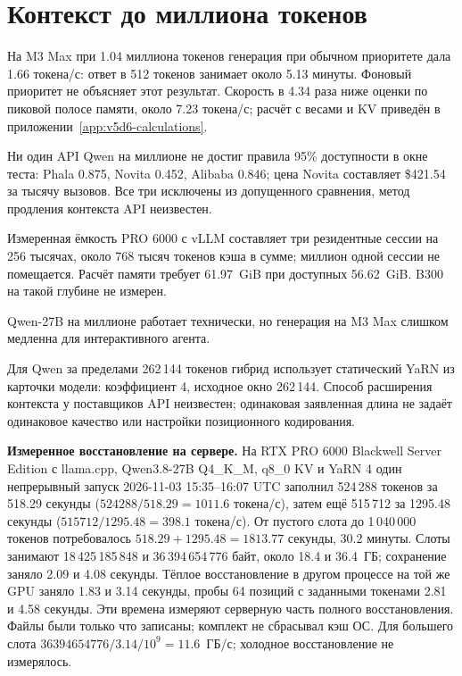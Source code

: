 \section{Контекст до миллиона токенов}
\label{sec:million}

На M3 Max при 1.04 миллиона токенов генерация при обычном приоритете дала 1.66 токена/с:
ответ в 512 токенов занимает около 5.13 минуты. Фоновый приоритет не объясняет этот результат.
Скорость в 4.34 раза ниже оценки по пиковой полосе памяти, около 7.23 токена/с;
расчёт с весами и KV приведён в приложении~\ref{app:v5d6-calculations}.

Ни один API Qwen на миллионе не достиг правила 95\% доступности в окне теста:
Phala 0.875, Novita 0.452, Alibaba 0.846; цена Novita составляет \$421.54 за тысячу вызовов.
Все три исключены из допущенного сравнения, метод продления контекста API неизвестен.

Измеренная ёмкость PRO 6000 с vLLM составляет три резидентные сессии на 256 тысячах,
около 768 тысяч токенов кэша в сумме; миллион одной сессии не помещается.
Расчёт памяти требует 61.97~GiB при доступных 56.62~GiB. B300 на такой глубине не измерен.

Qwen-27B на миллионе работает технически, но генерация на M3 Max слишком медленна для интерактивного агента.


Для Qwen за пределами 262\,144 токенов гибрид использует статический YaRN из карточки модели:
коэффициент 4, исходное окно 262\,144. Способ расширения контекста у поставщиков API неизвестен;
одинаковая заявленная длина не задаёт одинаковое качество или настройки позиционного кодирования.

\textbf{Измеренное восстановление на сервере.} На RTX PRO 6000 Blackwell Server Edition
с llama.cpp, Qwen3.8-27B Q4\_K\_M, q8\_0 KV и YaRN 4 один непрерывный запуск
2026-11-03 15:35--16:07 UTC заполнил 524\,288 токенов за 518.29 секунды
($524288/518.29=1011.6$ токена/с), затем ещё 515\,712 за 1295.48 секунды
($515712/1295.48=398.1$ токена/с). От пустого слота до 1\,040\,000 токенов
потребовалось $518.29+1295.48=1813.77$ секунды, 30.2 минуты.
Слоты занимают 18\,425\,185\,848 и 36\,394\,654\,776 байт, около 18.4 и 36.4~ГБ;
сохранение заняло 2.09 и 4.08 секунды. Тёплое восстановление в другом процессе на той же GPU заняло
1.83 и 3.14 секунды, пробы 64 позиций с заданными токенами 2.81 и 4.58 секунды.
Эти времена измеряют серверную часть полного восстановления.
Файлы были только что записаны; комплект не сбрасывал кэш ОС.
Для большего слота $36394654776/3.14/10^9=11.6$~ГБ/с; холодное восстановление не измерялось.

